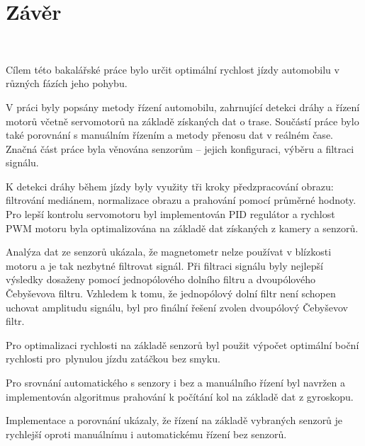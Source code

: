 \chapter{Závěr}
\label{sec:End}
\

Cílem této bakalářské práce bylo určit optimální rychlost jízdy automobilu v různých
fázích jeho pohybu.

V práci byly popsány metody řízení automobilu, zahrnující detekci dráhy a řízení
motorů včetně servomotorů na základě získaných dat o trase. Součástí práce bylo také
porovnání s manuálním řízením a metody přenosu dat v reálném čase. Značná část práce
byla věnována senzorům – jejich konfiguraci, výběru a filtraci signálu.

K detekci dráhy během jízdy byly využity tři kroky předzpracování obrazu: filtrování
mediánem, normalizace obrazu a prahování pomocí průměrné hodnoty. Pro lepší kontrolu
servomotoru byl implementován PID regulátor a rychlost PWM motoru byla optimalizována
na základě dat získaných z kamery a senzorů.

Analýza dat ze senzorů ukázala, že magnetometr nelze používat v blízkosti motoru a je
tak nezbytné filtrovat signál. Při filtraci signálu byly nejlepší výsledky dosaženy
pomocí jednopólového dolního filtru a dvoupólového Čebyševova filtru. Vzhledem k tomu,
že jednopólový dolní filtr není schopen uchovat amplitudu signálu, byl pro finální
řešení zvolen dvoupólový Čebyševov filtr.

Pro optimalizaci rychlosti na základě senzorů byl použit výpočet optimální boční
rychlosti pro~plynulou jízdu zatáčkou bez smyku.

Pro srovnání automatického s senzory i bez a manuálního řízení byl navržen a implementován algoritmus
prahování k počítání kol na základě dat z gyroskopu.

Implementace a porovnání ukázaly, že řízení na základě vybraných senzorů je rychlejší
oproti manuálnímu i automatickému řízení bez senzorů.

\endinput
